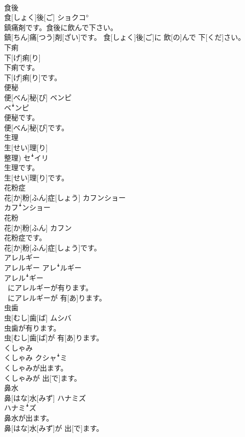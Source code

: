 \documentclass[8pt]{extreport}
\begin{document}
\begin{CJK}{UTF8}{min}
\\	食後	
\\	食[しょく]後[ご]	ショクコ°
\\	鎮痛剤です。食後に飲んで下さい。	
\\	鎮[ちん]痛[つう]剤[ざい]です。 食[しょく]後[ご]に 飲[の]んで 下[くだ]さい。
\\	下痢	
\\	下[げ]痢[り]
\\	下痢です。	
\\	下[げ]痢[り]です。
\\	便秘	
\\	便[べん]秘[ぴ]	ベンピ 
\\	ベꜜンピ
\\	便秘です。	
\\	便[べん]秘[ぴ]です。
\\	生理	
\\	生[せい]理[り] 
\\	整理)	セꜜイリ
\\	生理です。	
\\	生[せい]理[り]です。
\\	花粉症	
\\	花[か]粉[ふん]症[しょう]	カフンショー 
\\	カフꜜンショー
\\	花粉	
\\	花[か]粉[ふん]	カフン
\\	花粉症です。	
\\	花[か]粉[ふん]症[しょう]です。
\\	アレルギー	
\\	アレルギー	アレꜜルギー 
\\	アレルꜜギー
\\	~にアレルギーが有ります。	
\\	~にアレルギーが 有[あ]ります。
\\	虫歯	
\\	虫[むし]歯[ば]	ムシバ
\\	虫歯が有ります。	
\\	虫[むし]歯[ば]が 有[あ]ります。
\\	くしゃみ	
\\	くしゃみ	クシャꜜミ
\\	くしゃみが出ます。	
\\	くしゃみが 出[で]ます。
\\	鼻水	
\\	鼻[はな]水[みず]	ハナミズ 
\\	ハナミꜜズ
\\	鼻水が出ます。	
\\	鼻[はな]水[みず]が 出[で]ます。

\end{CJK}
\end{document}
